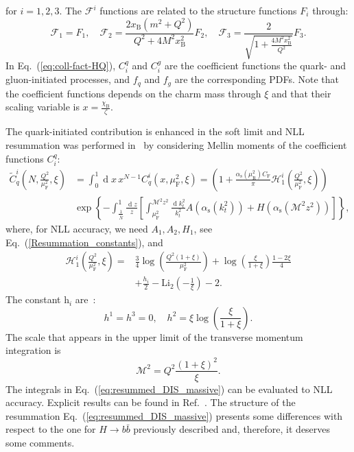 \documentclass[letterpaper,11pt]{article}
\newcommand{\as}{\alpha_\text{s}}
\newcommand{\cf}{C_{\text{F}}}
\DeclareMathOperator{\De}{d}
\newcommand{\de}{\De\!}
\newcommand{\xb}{x_{\text{B}}}
\newcommand{\chib}{\chi_{\text{B}}}
\newcommand{\muf}{\mu_{\text{F}}}
\newcommand{\mur}{\mu_{\text{R}}}
\begin{document}
for $i=1,2,3$. 
The $\mathcal{F}^i$ functions are related to the structure functions $F_i$ through:
\begin{equation}
		\mathcal{F}_1=F_1, \quad 
		\mathcal{F}_2=\frac{2 \xb(m^2+Q^2)}{Q^2+4M^2 \xb^2} F_2, \quad 
		\mathcal{F}_3=\frac{2}{\sqrt{1+\frac{4 M^2 \xb^2}{Q^2}}} F_3.
\end{equation}
In Eq.~(\ref{eq:coll-fact-HQ}), $C_i^q$ and $C_i^g$ are the coefficient functions the quark- and gluon-initiated processes, and $f_q$ and $f_g$ are the corresponding PDFs.
%
Note that the coefficient functions depends on the charm mass through $\xi$ and that their scaling variable is $x=\frac{\chib}{\zeta}$.

The quark-initiated contribution is enhanced in the soft limit and NLL resummation was performed in~\cite{Corcella:2003ib} by considering Mellin moments of the coefficient functions $C_i^q$:
\begin{align}\label{eq:resummed_DIS_massive}
\widetilde{C}^i_q\left(N,\frac{Q^2}{\muf^2},\xi\right)&= \int_0^1 \de  x \, x^{N-1}
C^i_q\left(x,\muf^2,\xi\right) 
=\left(1+ \frac{\as(\mur^2)\cf }{\pi}\mathcal{H}^i_1\left(\frac{Q^2}{\muf^2},\xi\right)\right) \nonumber \\
&
\exp\left\{-\int^{1}_{\frac{1}{\bar N}} \frac{\de z}{z} \left[\int^{\mathcal{M}^2 z^2}_{\muf^2} \frac{\de k_t^2}{k_t^2} A\left(\as(k_t^2)\right)+H\left(\as\left(\mathcal{M}^2z^2\right)\right)\right]\right\},
\end{align}
where, for NLL accuracy, we need $A_1,A_2,H_1$, see Eq.~(\ref{Resummation_constants}), and
\begin{align}
		\mathcal{H}^i_1\left(\frac{Q^2}{\muf^2},\xi\right)=& \frac{3}{4} \log{\left(\frac{Q^2(1+\xi)}{\muf^2}\right)}+\log{\left(\frac{\xi}{1+\xi}\right)}\frac{1-2\xi}{4}\\
		&+\frac{h_i}{2}-\text{Li}_2\left(-\frac{1}{\xi}\right)-2.
\end{align}
The constant $\textit{h}_i$ are~\cite{Gluck:1996ve}:
\begin{equation}
h^1=h^3=0,\quad h^2= \xi \log{\left(\frac{\xi}{1+\xi}\right)}.
\end{equation}
The scale that appears in the upper limit of the transverse momentum integration is 
\begin{equation}\label{eq:DIS_mass_scale}
\mathcal{M}^2=Q^2\frac{(1+\xi)^2}{\xi}.
\end{equation}
%
The integrals in Eq.~(\ref{eq:resummed_DIS_massive}) can be evaluated to NLL accuracy. Explicit results can be found in Ref.~\cite{Corcella:2003ib}. The structure of the resummation  Eq.~(\ref{eq:resummed_DIS_massive}) presents some differences with respect to the one for $H\to b\bar b$ previously described and, therefore, it deserves some comments. 
\end{document}
